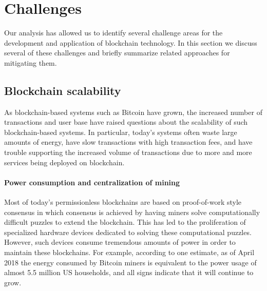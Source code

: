 
\section{Challenges}
\label{sec:challenges}

Our analysis has allowed us to identify several challenge areas for the development and application of blockchain technology.  In this section we discuss several of these challenges and briefly summarize related approaches for mitigating them.

\subsection{Blockchain scalability}
As blockchain-based systems such as Bitcoin have grown, the increased number of transactions and user base have raised questions about the scalability of such blockchain-based systems.  In particular, today's systems often waste large amounts of energy, have slow transactions with high transaction fees, and have trouble supporting the increased volume of transactions due to more and more services being deployed on blockchain.

\paragraph{Power consumption and centralization of mining}
Most of today's permissionless blockchains are based on proof-of-work style consensus in which consensus is achieved by having miners solve computationally difficult puzzles to extend the blockchain.  This has led to the proliferation of specialized hardware devices dedicated to solving these computational puzzles.  However, such devices consume tremendous amounts of power in order to maintain these blockchains.  For example, according to one estimate\cite{Digiconomist}, as of April 2018 the energy consumed by Bitcoin miners is equivalent to the power usage of almost 5.5 million US households, and all signs indicate that it will continue to grow.

